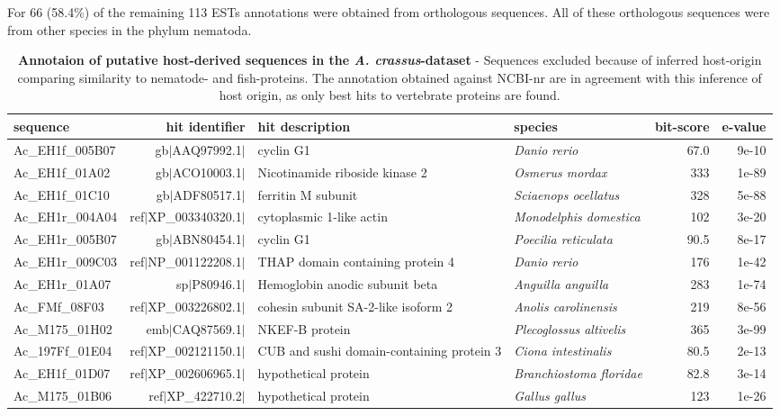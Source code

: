 For 66 (58.4\%) of the remaining 113 ESTs annotations were obtained
from orthologous sequences. All of these orthologous sequences were
from other species in the phylum nematoda.

\begin{sidewaystable}[ht]
\begin{center}
\begin{tabular}{lrp{3.5cm}lrr}
  \hline
  sequence & hit identifier & hit description &species & bit-score & e-value \\
  \hline
  Ac\_EH1f\_005B07 & gb$|$AAQ97992.1$|$ & cyclin G1 & \textit{Danio rerio} & 67.0 & 9e-10 \\ 
  Ac\_EH1f\_01A02 & gb$|$ACO10003.1$|$ &  Nicotinamide riboside kinase 2 & \textit{Osmerus mordax} &  333 & 1e-89 \\ 
  Ac\_EH1f\_01C10 & gb$|$ADF80517.1$|$ & ferritin M subunit & \textit{Sciaenops ocellatus}  &  328 & 5e-88 \\ 
  Ac\_EH1r\_004A04 & ref$|$XP\_003340320.1$|$ & cytoplasmic 1-like actin & \textit{Monodelphis domestica}  &  102 &3e-20 \\ 
  Ac\_EH1r\_005B07 & gb$|$ABN80454.1$|$ & cyclin G1  &\textit{Poecilia reticulata}  & 90.5 & 8e-17 \\ 
  Ac\_EH1r\_009C03 & ref$|$NP\_001122208.1$|$ & THAP domain containing protein 4 & \textit{Danio rerio}  &  176 & 1e-42 \\ 
  Ac\_EH1r\_01A07 & sp$|$P80946.1$|$ & Hemoglobin anodic subunit beta &\textit{Anguilla anguilla} & 283 &1e-74 \\ 
  Ac\_FMf\_08F03 & ref$|$XP\_003226802.1$|$ & cohesin subunit SA-2-like isoform 2 & \textit{Anolis carolinensis}  &  219 &8e-56 \\ 
  Ac\_M175\_01H02 & emb$|$CAQ87569.1$|$ & NKEF-B protein & \textit{Plecoglossus altivelis}  &  365 &3e-99 \\ 
  Ac\_197Ff\_01E04 & ref$|$XP\_002121150.1$|$ & CUB and sushi domain-containing protein 3 & \textit{Ciona intestinalis} & 80.5 & 2e-13 \\ 
  Ac\_EH1f\_01D07  & ref$|$XP\_002606965.1$|$ & hypothetical protein & \textit{Branchiostoma floridae} & 82.8 &3e-14 \\ 
  Ac\_M175\_01B06 & ref$|$XP\_422710.2$|$ & hypothetical protein & \textit{Gallus gallus} &  123 &1e-26 \\
  \hline
\end{tabular}
\end{center}
\caption[Annotaion of putative host-derived sequences in the
\textit{A. crassus}-dataset]{\textbf{Annotaion of putative
    host-derived sequences in the \textit{A. crassus}-dataset} -
  Sequences excluded because of inferred host-origin comparing
  similarity to nematode- and fish-proteins. The annotation obtained
  against NCBI-nr are in agreement with this inference of host origin,
  as only best hits to vertebrate proteins are found.}
\label{tab:hostan}
\end{sidewaystable}

     
